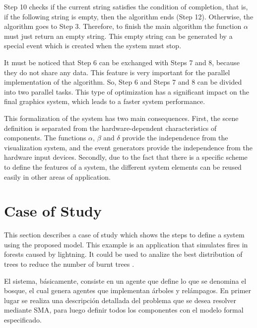 \documentclass[runningheads]{llncs}
\begin{document}
Step 10 checks if the current string satisfies the condition of completion, that is, if the
following string is empty, then the algorithm ends (Step 12). Otherwise, the algorithm goes to Step
3. Therefore, to finish the main algorithm the function $\alpha$ must just return an empty string.
This empty string can be generated by a special event which is created when the system must stop.

It must be noticed that Step 6 can be exchanged with Steps 7 and 8, because they do not share any
data. This feature is very important for the parallel implementation of the algorithm. So, Step 6
and Steps 7 and 8 can be divided into two parallel tasks. This type of optimization has a
significant impact on the final graphics system, which leads to a faster system performance.
	
This formalization of the system has two main consequences. First, the scene definition is
separated from the hardware-dependent characteristics of components. The functions $\alpha$,
$\beta$ and $\delta$ provide the independence from the visualization system, and the event
generators provide the independence from the hardware input devices. Secondly, due to the fact that
there is a specific scheme to define the features of a system, the different system elements can be
reused easily in other areas of application.
	
	
	
\section{Case of Study
\label{sec:case_study}}

This section describes a case of study which shows the steps to define a system using the proposed
model. This example is an application that simulates fires in forests caused by lightning. It could
be used to analize the best distribution of trees to reduce the number of burnt trees
\cite{John2007}.

El sistema, básicamente, consiste en un agente que define lo que se denomina el bosque, el cual genera agentes que implementan árboles y relámpagos. En primer lugar se realiza una descripción detallada del problema que se desea resolver mediante SMA, para luego definir todos los componentes con el modelo formal especificado.


\end{document}
